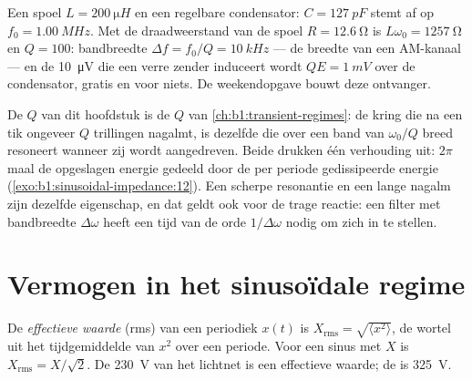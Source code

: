 \begin{example}\label{ex:b1:sinusoidal-impedance:radio}
Een spoel $L = \qty{200}{\micro H}$ en een regelbare condensator: $C =
\qty{127}{pF}$ stemt af op $f_0 = \qty{1.00}{MHz}$. Met de draadweerstand
van de spoel $R = \qty{12.6}{\ohm}$ is $L\omega_0 = \qty{1257}{\ohm}$ en
$Q = 100$: bandbreedte $\Delta f = f_0/Q = \qty{10}{kHz}$ --- de breedte van
een AM-kanaal --- en de \qty{10}{\micro V} die een verre zender induceert
wordt $QE = \qty{1}{mV}$ over de condensator, gratis en voor niets.
De weekendopgave bouwt deze ontvanger.
\end{example}

\begin{remark}\label{rem:b1:sinusoidal-impedance:Q}
De $Q$ van dit hoofdstuk is de $Q$ van \cref{ch:b1:transient-regimes}:
de kring die na een tik ongeveer $Q$ trillingen nagalmt, is dezelfde
die over een band van $\omega_0/Q$ breed resoneert wanneer zij wordt aangedreven. Beide
drukken één verhouding uit: $2\pi$ maal de opgeslagen energie gedeeld door de
per periode gedissipeerde energie (\cref{exo:b1:sinusoidal-impedance:12}). Een
scherpe resonantie en een lange nagalm zijn dezelfde eigenschap, en dat geldt ook voor de
trage reactie: een filter met bandbreedte $\Delta\omega$ heeft een tijd van de
orde $1/\Delta\omega$ nodig om zich in te stellen.
\end{remark}

\section{Vermogen in het sinusoïdale regime}

\begin{definition}\label{def:b1:sinusoidal-impedance:rms}
De \emph{effectieve waarde} (rms) van een periodiek
 $x(t)$ is $X_{\mathrm{rms}} = \sqrt{\langle x^2\rangle}$, de
wortel uit het tijdgemiddelde van $x^2$ over een periode. Voor een sinus
met  $X$ is $X_{\mathrm{rms}} = X/\sqrt2$. De \qty{230}{V} van het
lichtnet is een effectieve waarde; de  is \qty{325}{V}.
\end{definition}

